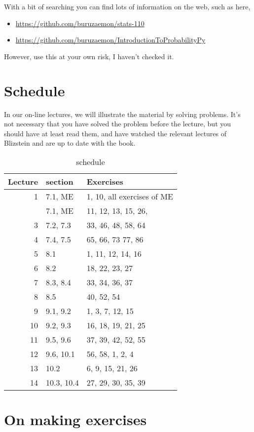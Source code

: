 \documentclass[a4paper]{article}
\theoremstyle{definition}
\newcommand{\1}[1]{\,I_{#1}} %
\begin{document}
With a bit of searching you can find lots of information on the web, such as here, 
\begin{itemize}
\item \url{https://github.com/buruzaemon/stats-110}
\item \url{https://github.com/buruzaemon/IntroductionToProbabilityPy}
\end{itemize}
However, use this at your own risk, I haven't checked it.

\section{Schedule}
\label{sec:orgef74814}

In our on-line lectures, we will illustrate the material by solving problems.
It's not necessary that you have solved the problem before the lecture, but you should have at least read them, and have watched the relevant lectures of Blizstein and are up to date with the book.

\begin{table}[htbp]
\caption{schedule}
\centering
\begin{tabular}{rll}
Lecture & section & Exercises\\
\hline
1 & 7.1, ME & 1, 10, all exercises of ME\\
 & 7.1, ME & 11, 12, 13, 15, 26,\\
\hline
3 & 7.2, 7.3 & 33, 46, 48, 58, 64\\
4 & 7.4, 7.5 & 65, 66, 73 77, 86\\
\hline
5 & 8.1 & 1, 11, 12, 14, 16\\
6 & 8.2 & 18, 22, 23, 27\\
\hline
7 & 8.3, 8.4 & 33, 34, 36, 37\\
8 & 8.5 & 40, 52, 54\\
\hline
9 & 9.1, 9.2 & 1, 3, 7, 12, 15\\
10 & 9.2, 9.3 & 16, 18, 19, 21, 25\\
\hline
11 & 9.5, 9.6 & 37, 39, 42, 52, 55\\
12 & 9.6, 10.1 & 56, 58, 1, 2, 4\\
\hline
13 & 10.2 & 6, 9, 15, 21, 26\\
14 & 10.3, 10.4 & 27, 29, 30, 35, 39\\
\hline
\end{tabular}
\end{table}



\section{On making exercises}
\label{sec:org90b1f8d}
\end{document}
